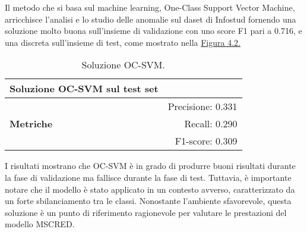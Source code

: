 
Il metodo che si basa sul machine learning, One-Class Support Vector Machine, arricchisce l'analisi e lo studio 
delle anomalie sul daset di Infostud fornendo una soluzione molto buona sull'insieme di validazione con uno score F1 pari 
a 0.716, e una discreta sull'insieme di test, come mostrato nella 
\hyperref[tab:ocsvm-metrics]{Figura 4.2.}


\begin{table}[H]
    \centering
    \caption{Soluzione OC-SVM.}
    \begin{tabular}{lr}
    \toprule
    \textbf{Soluzione OC-SVM sul test set}  \\
    \midrule
    \multirow{3}{*}{\textbf{Metriche}} 
        & Precisione: 0.331 \\
        & Recall: 0.290 \\
        & F1-score: 0.309 \\
    \bottomrule
    \end{tabular}
    \label{tab:ocsvm-metrics}
\end{table}

I risultati mostrano che OC-SVM è in grado di produrre buoni risultati durante la fase di 
validazione ma fallisce durante la fase di test. Tuttavia, è importante notare che il modello è stato applicato 
in un contesto avverso, caratterizzato da un forte sbilanciamento tra le classi. Nonostante l'ambiente sfavorevole, 
questa soluzione è un punto di riferimento ragionevole per valutare le prestazioni del modello MSCRED.
